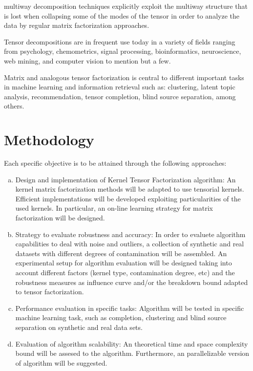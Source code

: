 \documentclass[letterpaper,12pt]{article}
\begin{document}
multiway decomposition techniques explicitly exploit the multiway structure that is lost when collapsing some of the modes of the tensor in order to analyze the data by regular matrix factorization approaches.

Tensor decompositions are in frequent use today in a variety of fields ranging from psychology, chemometrics, signal processing, bioinformatics, neuroscience, web mining, and computer vision to mention but a few.

Matrix and analogous tensor factorization is central to different important tasks in machine learning and information retrieval such as: clustering, latent topic analysis, recommendation, tensor completion, blind source separation, among others.


\section{Methodology}

Each specific objective is to be attained through the following approaches:

\begin{enumerate}[(a)]
 \item Design and implementation of Kernel Tensor Factorization algorithm: An kernel matrix factorization methods will be adapted to use tensorial kernels. Efficient implementations will be developed exploiting particularities of the used kernels. In particular, an on-line learning strategy for matrix factorization will be designed.
 \item Strategy to evaluate robustness and accuracy: In order to evaluete algorithm capabilities to deal with noise and outliers, a collection of synthetic and real datasets with different degrees of contamination will be assembled. An experimental setup for algorithm evaluation will be designed taking into account different factors (kernel type, contamination degree, etc) and the robustness measures as influence curve and/or the breakdown bound adapted to tensor factorization.
 \item Performance evaluation in specific tasks: Algorithm will be tested in specific machine learning task, such as completion, clustering and blind source separation on synthetic and real data sets.
 \item Evaluation of algorithm scalability: An theoretical time and space complexity bound will be assesed to the algorithm. Furthermore, an parallelizable version of algorithm will be suggested.
\end{enumerate}
\end{document}
